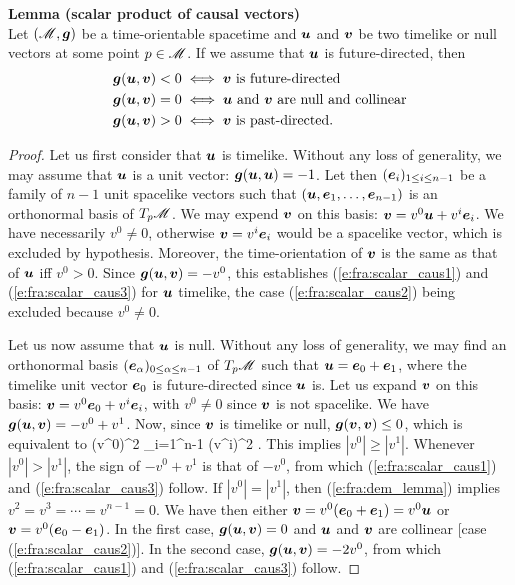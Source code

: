 \begin{greybox}
\textbf{Lemma (scalar product of causal vectors)}\\[1ex]
Let $(\mathscr{M},\bm{g})$ be a time-orientable spacetime and $\bm{u}$ and $\bm{v}$
be two timelike or null vectors at some point $p\in\mathscr{M}$.
If we assume that $\bm{u}$ is future-directed, then
\begin{subequations}
\begin{align}
& \bm{g}(\bm{u},\bm{v}) < 0 \iff \bm{v} \ \mbox{is future-directed} \label{e:fra:scalar_caus1} \\
& \bm{g}(\bm{u},\bm{v}) = 0 \iff \mbox{$\bm{u}$ and $\bm{v}$ are null and collinear} \label{e:fra:scalar_caus2}\\
& \bm{g}(\bm{u},\bm{v}) > 0 \iff \bm{v} \ \mbox{is past-directed} . \label{e:fra:scalar_caus3}
\end{align}
\end{subequations}
\end{greybox}
\begin{proof}
Let us first consider that $\bm{u}$ is timelike. Without any loss
of generality, we may assume that $\bm{u}$ is a unit vector: $\bm{g}(\bm{u},\bm{u}) = -1$.
Let then $(\bm{e}_i)_{1\leq i \leq n-1}$ be a family of $n-1$ unit spacelike vectors such
that $(\bm{u},\bm{e}_1,\ldots,\bm{e}_{n-1})$ is an orthonormal basis of $T_p\mathscr{M}$.
We may expend $\bm{v}$ on this basis: $\bm{v} = v^0 \bm{u} + v^i \bm{e}_i$.
We have
necessarily $v^0 \not = 0$, otherwise $\bm{v} = v^i \bm{e}_i$ would be a spacelike
vector, which is excluded by hypothesis.
Moreover, the time-orientation of $\bm{v}$ is the same as that of $\bm{u}$
iff $v^0>0$. Since $\bm{g}(\bm{u},\bm{v}) = - v^0$, this
establishes (\ref{e:fra:scalar_caus1}) and (\ref{e:fra:scalar_caus3}) for
$\bm{u}$ timelike, the case (\ref{e:fra:scalar_caus2}) being excluded
because $v^0\not = 0$.

Let us now assume that $\bm{u}$ is null. Without any loss of generality,
we may find an orthonormal basis $(\bm{e}_\alpha)_{0\leq \alpha\leq n-1}$ of
$T_p\mathscr{M}$ such that $\bm{u} = \bm{e}_0 + \bm{e}_1$, where the timelike unit vector
$\bm{e}_0$ is future-directed since $\bm{u}$ is. Let us expand $\bm{v}$ on this
basis: $\bm{v} = v^0 \bm{e}_0 + v^i \bm{e}_i$, with $v^0 \not = 0$ since
$\bm{v}$ is not spacelike. We have
$\bm{g}(\bm{u},\bm{v}) = -v^0 + v^1$. Now, since $\bm{v}$ is timelike or null,
$\bm{g}(\bm{v},\bm{v}) \leq 0$, which is equivalent to
\be \label{e:fra:dem_lemma}
    (v^0)^2 \geq \sum_{i=1}^{n-1} (v^i)^2 .
\ee
This implies $|v^0| \geq |v^1|$. Whenever $|v^0| > |v^1|$, the sign of
$-v^0 + v^1$ is that of $-v^0$, from which (\ref{e:fra:scalar_caus1}) and (\ref{e:fra:scalar_caus3}) follow. If $|v^0| = |v^1|$, then (\ref{e:fra:dem_lemma})
implies $v^2=v^3=\cdots=v^{n-1} = 0$. We have then
either $\bm{v} = v^0 (\bm{e}_0 + \bm{e}_1) = v^0 \bm{u}$ or
$\bm{v} = v^0 (\bm{e}_0 - \bm{e}_1)$. In the first case, $\bm{g}(\bm{u},\bm{v})=0$
and $\bm{u}$ and $\bm{v}$ are collinear [case (\ref{e:fra:scalar_caus2})]. In
the second case, $\bm{g}(\bm{u},\bm{v}) = -2 v^0$, from which (\ref{e:fra:scalar_caus1}) and (\ref{e:fra:scalar_caus3}) follow.
\end{proof}

